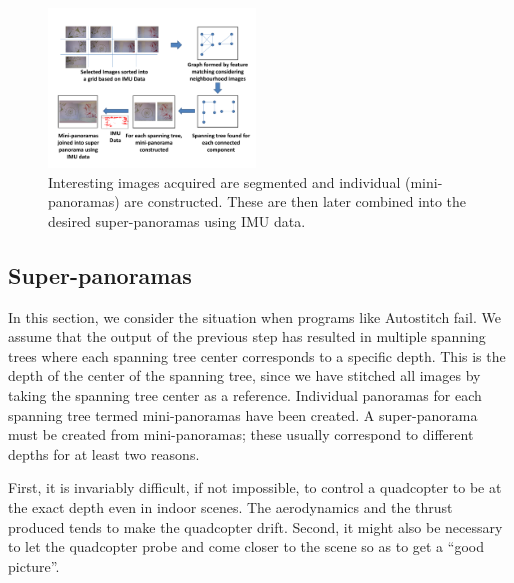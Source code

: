 \documentclass[10pt,twocolumn,letterpaper]{article}
\begin{document}
\begin{figure}[h!]
  \centering
  \includegraphics[width=0.49\textwidth]{figures/graphCreation} 
  \caption{ \label{fig:graph} Interesting images acquired are
    segmented and individual (mini-panoramas) are constructed. These
    are then later combined into the desired super-panoramas using IMU data.}
\end{figure}    


\subsection{Super-panoramas}
In this section, we consider the situation when programs like
Autostitch fail.  We assume that the output of the previous step has
resulted in multiple spanning trees where each spanning tree center
corresponds to a specific depth. This is the depth of the center of
the spanning tree, since we have stitched all images by taking the
spanning tree center as a reference.  Individual panoramas for each
spanning tree termed mini-panoramas have been created. A
super-panorama must be created from mini-panoramas; these usually
correspond to different depths for at least two reasons.

First, it is invariably difficult, if not impossible, to control a
quadcopter to be at the exact depth even in indoor scenes.  The
aerodynamics and the thrust produced tends to make the quadcopter
drift.  Second, it might also be necessary to let the quadcopter probe
and come closer to the scene so as to get a ``good picture''.
\end{document}
